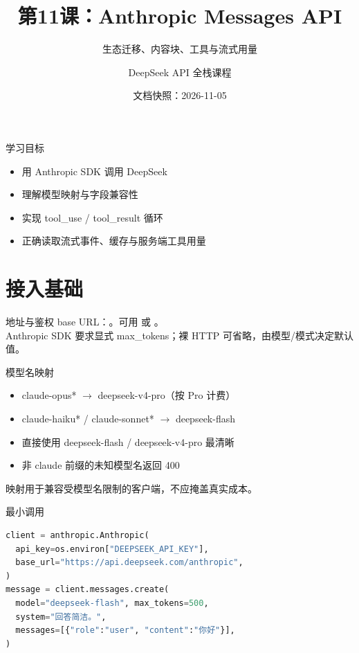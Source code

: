\documentclass[aspectratio=169,UTF8]{ctexbeamer}
\title{第11课：Anthropic Messages API}
\subtitle{生态迁移、内容块、工具与流式用量}
\author{DeepSeek API 全栈课程}
\date{文档快照：2026-11-05}
\begin{document}
\frame{\titlepage}
\begin{frame}{学习目标}
\begin{itemize}
  \item 用 Anthropic SDK 调用 DeepSeek
  \item 理解模型映射与字段兼容性
  \item 实现 tool\_use / tool\_result 循环
  \item 正确读取流式事件、缓存与服务端工具用量
\end{itemize}
\end{frame}
\section{接入基础}
\begin{frame}{地址与鉴权}
base URL：。可用  或 。\\[8pt]
Anthropic SDK 要求显式 max\_tokens；裸 HTTP 可省略，由模型/模式决定默认值。
\end{frame}
\begin{frame}{模型名映射}
\begin{itemize}
  \item claude-opus* $\rightarrow$ deepseek-v4-pro（按 Pro 计费）
  \item claude-haiku* / claude-sonnet* $\rightarrow$ deepseek-flash
  \item 直接使用 deepseek-flash / deepseek-v4-pro 最清晰
  \item 非 claude 前缀的未知模型名返回 400
\end{itemize}
映射用于兼容受模型名限制的客户端，不应掩盖真实成本。
\end{frame}
\begin{frame}[fragile]{最小调用}
\begin{lstlisting}[language=Python]
client = anthropic.Anthropic(
  api_key=os.environ["DEEPSEEK_API_KEY"],
  base_url="https://api.deepseek.com/anthropic",
)
message = client.messages.create(
  model="deepseek-flash", max_tokens=500,
  system="回答简洁。",
  messages=[{"role":"user", "content":"你好"}],
)
\end{lstlisting}
\end{frame}
\end{document}
